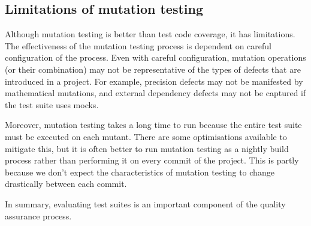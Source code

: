 \documentclass[a4paper, openany]{memoir}
\begin{document}
\subsection{Limitations of mutation testing}
Although mutation testing is better than test code coverage, it has limitations. The effectiveness of the mutation testing process is dependent on careful configuration of the process. Even with careful configuration, mutation operations (or their combination) may not be representative of the types of defects that are introduced in a project. For example, precision defects may not be manifested by mathematical mutations, and external dependency defects may not be captured if the test suite uses mocks. 

Moreover, mutation testing takes a long time to run because the entire test suite must be executed on each mutant. There are some optimisations available to mitigate this, but it is often better to run mutation testing as a nightly build process rather than performing it on every commit of the project. This is partly because we don't expect the characteristics of mutation testing to change drastically between each commit.

In summary, evaluating test suites is an important component of the quality assurance process.
\end{document}
